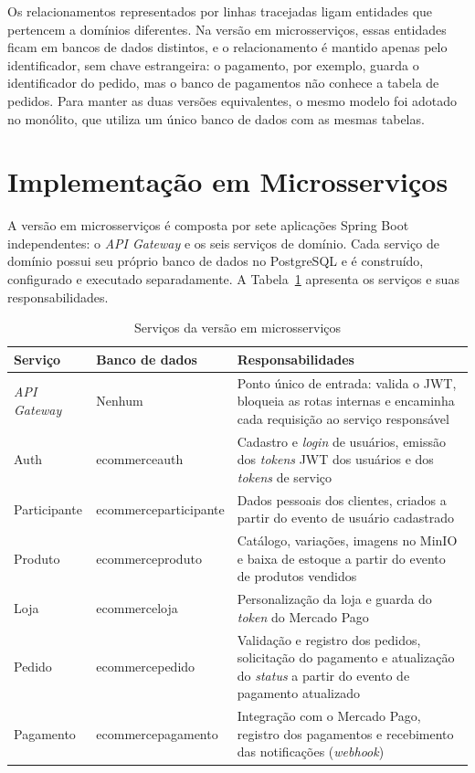 Os relacionamentos representados por linhas tracejadas ligam entidades que pertencem a
domínios diferentes. Na versão em microsserviços, essas entidades ficam em bancos de dados
distintos, e o relacionamento é mantido apenas pelo identificador, sem chave estrangeira: o
pagamento, por exemplo, guarda o identificador do pedido, mas o banco de pagamentos não conhece a
tabela de pedidos. Para manter as duas versões equivalentes, o mesmo modelo foi adotado no
monólito, que utiliza um único banco de dados com as mesmas tabelas.

\section{Implementação em Microsserviços}

A versão em microsserviços é composta por sete aplicações Spring Boot independentes: o
\textit{API Gateway} e os seis serviços de domínio. Cada serviço de domínio possui seu próprio
banco de dados no PostgreSQL e é construído, configurado e executado separadamente. A
Tabela~\ref{tab:servicos} apresenta os serviços e suas responsabilidades.

\begin{table}[htbp]
\centering
\caption{Serviços da versão em microsserviços}
\label{tab:servicos}
\small
\begin{tabular}{|>{\raggedright\arraybackslash}p{2.6cm}|>{\raggedright\arraybackslash}p{3.6cm}|>{\raggedright\arraybackslash}p{8.4cm}|}
\hline
\textbf{Serviço} & \textbf{Banco de dados} & \textbf{Responsabilidades} \\ \hline
\textit{API Gateway} & Nenhum & Ponto único de entrada: valida o JWT, bloqueia as rotas internas e encaminha cada requisição ao serviço responsável \\ \hline
Auth & ecommerceauth & Cadastro e \textit{login} de usuários, emissão dos \textit{tokens} JWT dos usuários e dos \textit{tokens} de serviço \\ \hline
Participante & ecommerce\-participante & Dados pessoais dos clientes, criados a partir do evento de usuário cadastrado \\ \hline
Produto & ecommerceproduto & Catálogo, variações, imagens no MinIO e baixa de estoque a partir do evento de produtos vendidos \\ \hline
Loja & ecommerceloja & Personalização da loja e guarda do \textit{token} do Mercado Pago \\ \hline
Pedido & ecommercepedido & Validação e registro dos pedidos, solicitação do pagamento e atualização do \textit{status} a partir do evento de pagamento atualizado \\ \hline
Pagamento & ecommerce\-pagamento & Integração com o Mercado Pago, registro dos pagamentos e recebimento das notificações (\textit{webhook}) \\ \hline
\end{tabular}
\par\vspace{4pt}{\footnotesize Fonte: Elaborada pelo autor (2026).}
\end{table}


